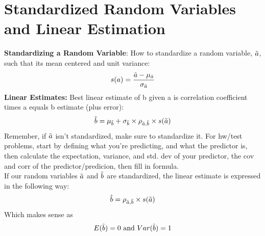 \documentclass[12pt,twoside]{article}
\newcommand{\rnd}{\Tilde}
\newcommand{\ra}{\rnd{ a}  }
\newcommand{\rb}{\rnd{ b}  }
\begin{document}
\newpage 
\section*{Standardized Random Variables and Linear Estimation}
\textbf{Standardizing a Random Variable}:
How to standardize a random variable, $\ra$, such that its mean centered and unit variance:
$$
    s(a) = \frac{\ra-\mu_{\ra}}{\sigma_{\ra}}
$$
\textbf{Linear Estimates:}
Best linear estimate of b given a is correlation coefficient times a equals b estimate (plus error):
$$
    \hat{b} = \mu_{\rb} + \sigma_{\rb} \times \rho_{\ra,\rb} \times s(\ra)
$$
Remember, if $\ra$ isn't standardized, make sure to standardize it. For hw/test problems, start by defining what you're predicting, and what the predictor is, then calculate the expectation, variance, and std. dev of your predictor, the cov and corr of the predictor/predicion, then fill in formula.\\
If our random variables $\ra$ and $\rb$ are standardized, the linear estimate is expressed in the following way:
$$
    \hat{b} = \rho_{\ra,\rb} \times s(\ra)
$$
Which makes sense as $$E(\rb)=0 \text{ and } Var(\rb)=1$$
\end{document}
